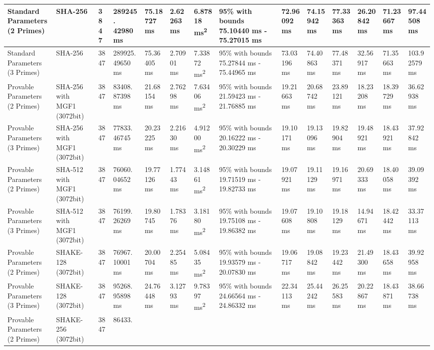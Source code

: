 \documentclass[]{final_report}
\theoremstyle{definition}
\begin{document}
\begin{landscape}
\begin{longtable}{|p{2.3cm}|p{1.8cm}|p{1.0cm}|p{1.7cm}|p{1.4cm}|p{1.5cm}|p{1.8cm}|p{1.5cm}|p{1.43cm}|p{1.5cm}|p{1.3cm}|p{1.4cm}|p{1.3cm}|p{1.37cm}|}
Standard Parameters (2 Primes) & SHA-256 & 3847 & 289245.
42980 ms & 75.18727 ms & 2.62263 ms & 6.87818 ms\textsuperscript{2} & 95\% with bounds 75.10440 ms - 75.27015 ms & 72.96092 ms & 74.15942 ms & 77.33363 ms & 26.20842 ms & 71.23667 ms & 97.44508 ms \\
\hline
Standard Parameters (3 Primes) & SHA-256 & 3847 & 289925.
49650 ms & 75.36405 ms & 2.70901 ms & 7.33872 ms\textsuperscript{2} & 95\% with bounds 75.27844 ms - 75.44965 ms & 73.03196 ms & 74.40863 ms & 77.48371 ms & 32.56917 ms & 71.35663 ms & 103.92579 ms \\
\hline
Provable Parameters (2 Primes) & SHA-256 with MGF1 (3072bit) & 3847 & 83408.
87398 ms & 21.68154 ms & 2.76298 ms & 7.63406 ms\textsuperscript{2} & 95\% with bounds 21.59423 ms - 21.76885 ms & 19.21663 ms & 20.68742 ms & 23.89121 ms & 18.23208 ms & 18.39729 ms & 36.62938 ms \\
\hline
Provable Parameters (3 Primes) & SHA-256 with MGF1 (3072bit) & 3847 & 77833.
46745 ms & 20.23225 ms & 2.21630 ms & 4.91200 ms\textsuperscript{2} & 95\% with bounds 20.16222 ms - 20.30229 ms & 19.10171 ms & 19.13096 ms & 19.82904 ms & 19.48921 ms & 18.43921 ms & 37.92842 ms \\
\hline
Provable Parameters (2 Primes) & SHA-512 with MGF1 (3072bit) & 3847 & 76060.
04652 ms & 19.77126 ms & 1.77443 ms & 3.14861 ms\textsuperscript{2} & 95\% with bounds 19.71519 ms - 19.82733 ms & 19.07921 ms & 19.11129 ms & 19.16971 ms & 20.69333 ms & 18.40058 ms & 39.09392 ms \\
\hline
Provable Parameters (3 Primes) & SHA-512 with MGF1 (3072bit) & 3847 & 76199.
26269 ms & 19.80745 ms & 1.78376 ms & 3.18180 ms\textsuperscript{2} & 95\% with bounds 19.75108 ms - 19.86382 ms & 19.07608 ms & 19.10808 ms & 19.18129 ms & 14.94671 ms & 18.42442 ms & 33.37113 ms \\
\hline
Provable Parameters (2 Primes) & SHAKE-128 (3072bit) & 3847 & 76967.
10001 ms & 20.00704 ms & 2.25485 ms & 5.08435 ms\textsuperscript{2} & 95\% with bounds 19.93579 ms - 20.07830 ms & 19.06717 ms & 19.08842 ms & 19.23442 ms & 21.49300 ms & 18.43658 ms & 39.92958 ms \\
\hline
Provable Parameters (3 Primes) & SHAKE-128 (3072bit) & 3847 & 95268.
95898 ms & 24.76448 ms & 3.12793 ms & 9.78397 ms\textsuperscript{2} & 95\% with bounds 24.66564 ms - 24.86332 ms & 22.34113 ms & 25.44242 ms & 26.25583 ms & 20.22867 ms & 18.43871 ms & 38.66738 ms \\
\hline
Provable Parameters (2 Primes) & SHAKE-256 (3072bit) & 3847 & 86433.

\end{longtable}
\end{landscape}
\end{document}
